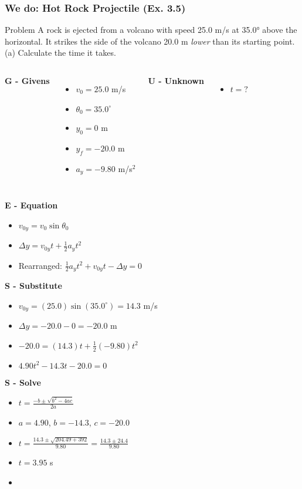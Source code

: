 \documentclass{beamer}
\begin{document}
\begin{frame}
\frametitle{We do: Hot Rock Projectile (Ex. 3.5)}
\begin{block}{Problem}
A rock is ejected from a volcano with speed 25.0 m/s at 35.0° above the horizontal. It strikes the side of the volcano 20.0 m \textit{lower} than its starting point. (a) Calculate the time it takes.
\end{block}

\begin{columns}[T]
\textbf{G - Givens}
\begin{itemize}
\item $v_0 = 25.0$ m/s
\item $\theta_0 = 35.0^\circ$
\item $y_0 = 0$ m
\item $y_f = -20.0$ m
\item $a_y = -9.80$ m/s$^2$
\end{itemize}

\textbf{U - Unknown}
\begin{itemize}
\item $t = ?$
\end{itemize}
\end{columns}

\textbf{E - Equation}
\begin{itemize}
\item $v_{0y} = v_0 \sin\theta_0$
\item $\Delta y = v_{0y}t + \frac{1}{2}a_y t^2$
\item Rearranged: $\frac{1}{2}a_y t^2 + v_{0y}t - \Delta y = 0$
\end{itemize}

\textbf{S - Substitute}
\begin{itemize}
\item $v_{0y} = (25.0)\sin(35.0^\circ) = 14.3$ m/s
\item $\Delta y = -20.0 - 0 = -20.0$ m
\item $-20.0 = (14.3)t + \frac{1}{2}(-9.80)t^2$
\item $4.90t^2 - 14.3t - 20.0 = 0$
\end{itemize}

\textbf{S - Solve}
\begin{itemize}
\item $t = \frac{-b \pm \sqrt{b^2 - 4ac}}{2a}$
\item $a = 4.90$, $b = -14.3$, $c = -20.0$
\item $t = \frac{14.3 \pm \sqrt{204.49 + 392}}{9.80} = \frac{14.3 \pm 24.4}{9.80}$
\item $t = 3.95$ s
\item {}
\end{itemize}
\end{frame}
\end{document}
